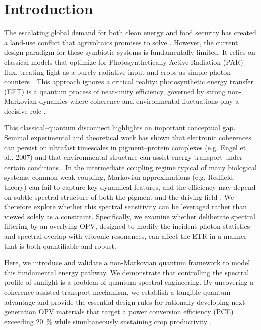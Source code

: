 \documentclass[aps,prb,onecolumn,superscriptaddress,notitlepage,nofootinbib,longbibliography,10pt]{revtex4-2}
\begin{document}
\maketitle

\section{Introduction}\label{sec1}

The escalating global demand for both clean energy and food security has created a land-use conflict that agrivoltaics promises to solve \cite{Valle2017}. However, the current design paradigm for these symbiotic systems is fundamentally limited. It relies on classical models that optimize for Photosynthetically Active Radiation (PAR) flux, treating light as a purely radiative input and crops as simple photon counters \cite{MaLu2025}. This approach ignores a critical reality: photosynthetic energy transfer (EET) is a quantum process of near-unity efficiency, governed by strong non-Markovian dynamics where coherence and environmental fluctuations play a decisive role \cite{mohs2008, tao2020}.

This classical–quantum disconnect highlights an important conceptual gap. Seminal experimental and theoretical work has shown that electronic coherences can persist on ultrafast timescales in pigment–protein complexes (e.g. Engel et al., 2007) and that environmental structure can assist energy transport under certain conditions \cite{Engel2007, Plenio2008, Sarovar2010}. In the intermediate coupling regime typical of many biological systems, common weak-coupling, Markovian approximations (e.g. Redfield theory) can fail to capture key dynamical features, and the efficiency may depend on subtle spectral structure of both the pigment and the driving field \cite{Curutchet2016}. We therefore explore whether this spectral sensitivity can be leveraged rather than viewed solely as a constraint. Specifically, we examine whether deliberate spectral filtering by an overlying OPV, designed to modify the incident photon statistics and spectral overlap with vibronic resonances, can affect the ETR in a manner that is both quantifiable and robust.

Here, we introduce and validate a non-Markovian quantum framework to model this fundamental energy pathway. We demonstrate that controlling the spectral profile of sunlight is a problem of quantum spectral engineering. By uncovering a coherence-assisted transport mechanism, we establish a tangible quantum advantage and provide the essential design rules for rationally developing next-generation OPV materials that target a power conversion efficiency (PCE) exceeding \SI{20}{\percent} while simultaneously sustaining crop productivity \cite{firdaus2019, Shi2025}.
\end{document}
